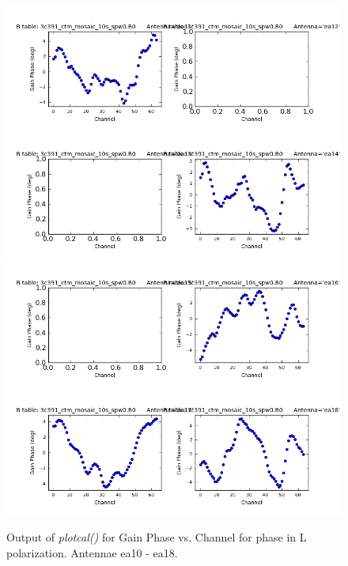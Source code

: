 \documentclass[12pt, a4paper]{article}
\begin{document}
\begin{figure}[h!]
\centering
\includegraphics[scale=0.65]{../Imaging/plots2/part4-subE-question3b_phase_pol-L-ea10-ea14.png}
\includegraphics[scale=0.65]{../Imaging/plots2/part4-subE-question3b_phase_pol-L-ea15-ea18.png}
\caption{Output of \emph{plotcal()} for Gain Phase vs. Channel for phase in L polarization. Antennae ea10 - ea18.}
\end{figure}
\addtocounter{figure}{-1}
\end{document}
